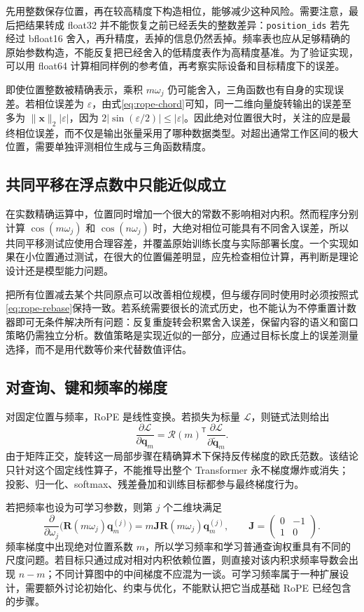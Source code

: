 \documentclass[UTF8,12pt,a4paper,fontset=fandol]{ctexart}
\begin{document}
先用整数保存位置，再在较高精度下构造相位，能够减少这种风险。需要注意，最后把结果转成 float32 并不能恢复之前已经丢失的整数差异：\texttt{position\_ids} 若先经过 bfloat16 舍入，再升精度，丢掉的信息仍然丢掉。频率表也应从足够精确的原始参数构造，不能反复把已经舍入的低精度表作为高精度基准。为了验证实现，可以用 float64 计算相同样例的参考值，再考察实际设备和目标精度下的误差。

即使位置整数被精确表示，乘积 $m\omega_j$ 仍可能舍入，三角函数也有自身的实现误差。若相位误差为 $\varepsilon$，由式\eqref{eq:rope-chord}可知，同一二维向量旋转输出的误差至多为 $\|\mathbf x\|_2|\varepsilon|$，因为 $2|\sin(\varepsilon/2)|\leq|\varepsilon|$。因此绝对位置很大时，关注的应是最终相位误差，而不仅是输出张量采用了哪种数据类型。对超出通常工作区间的极大位置，需要单独评测相位生成与三角函数精度。

\subsection{共同平移在浮点数中只能近似成立}
在实数精确运算中，位置同时增加一个很大的常数不影响相对内积。然而程序分别计算 $\cos(m\omega_j)$ 和 $\cos(n\omega_j)$ 时，大绝对相位可能具有不同舍入误差，所以共同平移测试应使用合理容差，并覆盖原始训练长度与实际部署长度。一个实现如果在小位置通过测试，在很大的位置偏差明显，应先检查相位计算，再判断是理论设计还是模型能力问题。

把所有位置减去某个共同原点可以改善相位规模，但与缓存同时使用时必须按照式\eqref{eq:rope-rebase}保持一致。若系统需要很长的流式历史，也不能认为不停重置计数器即可无条件解决所有问题：反复重旋转会积累舍入误差，保留内容的语义和窗口策略仍需独立分析。数值策略是实现近似的一部分，应通过目标长度上的误差测量选择，而不是用代数等价来代替数值评估。

\subsection{对查询、键和频率的梯度}
对固定位置与频率，RoPE 是线性变换。若损失为标量 $\mathcal L$，则链式法则给出
\begin{equation}
\frac{\partial\mathcal L}{\partial\mathbf q_m}
=\mathcal R(m)^{\mathsf T}
\frac{\partial\mathcal L}{\partial\widetilde{\mathbf q}_m}.
\label{eq:rope-backward}
\end{equation}
由于矩阵正交，旋转这一局部步骤在精确算术下保持反传梯度的欧氏范数。该结论只针对这个固定线性算子，不能推导出整个 Transformer 永不梯度爆炸或消失；投影、归一化、softmax、残差叠加和训练目标都参与最终梯度行为。

若把频率也设为可学习参数，则第 $j$ 个二维块满足
\[
\frac{\partial}{\partial\omega_j}
\bigl(\mathbf R(m\omega_j)\mathbf q_m^{(j)}\bigr)
=m\mathbf J\mathbf R(m\omega_j)\mathbf q_m^{(j)},
\qquad \mathbf J=\begin{pmatrix}0&-1\\1&0\end{pmatrix}.
\]
频率梯度中出现绝对位置系数 $m$，所以学习频率和学习普通查询权重具有不同的尺度问题。若目标只通过成对相对内积依赖位置，则直接对该内积求频率导数会出现 $n-m$；不同计算图中的中间梯度不应混为一谈。可学习频率属于一种扩展设计，需要额外讨论初始化、约束与优化，不能默认把它当成基础 RoPE 已经包含的步骤。
\end{document}

